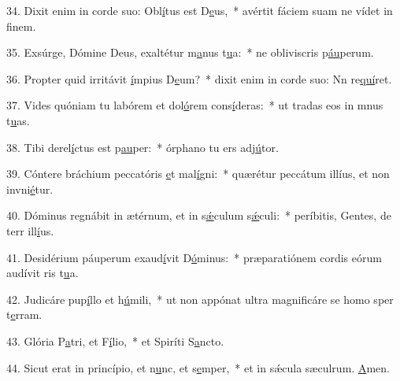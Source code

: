 34. Dixit enim in corde suo: Obl\uline{í}tus est D\uline{e}us,~* avértit fáciem suam ne vídet in f\uline{i}nem.\par 
35. Exsúrge, Dómine Deus, exaltétur m\uline{a}nus t\uline{u}a:~* ne obliviscris p\uline{áu}perum.\par 
36. Propter quid irritávit \uline{í}mpius D\uline{e}um?~* dixit enim in corde suo: Nn re\uline{quí}ret.\par 
37. Vides quóniam tu labórem et dol\uline{ó}rem cons\uline{í}deras:~* ut tradas eos in mnus t\uline{u}as.\par 
38. Tibi derel\uline{í}ctus est p\uline{au}per:~* órphano tu ers adj\uline{ú}tor.\par 
39. Cóntere bráchium peccatóris \uline{e}t mal\uline{í}gni:~* quærétur peccátum illíus, et non invni\uline{é}tur.\par 
40. Dóminus regnábit in ætérnum, et in s\uline{ǽ}culum s\uline{ǽ}culi:~* períbitis, Gentes, de terr ill\uline{í}us.\par 
41. Desidérium páuperum exaud\uline{í}vit D\uline{ó}minus:~* præparatiónem cordis eórum audívit ris t\uline{u}a.\par 
42. Judicáre pup\uline{í}llo et h\uline{ú}mili,~* ut non appónat ultra magnificáre se homo sper t\uline{e}rram.\par 
43. Glória P\uline{a}tri, et F\uline{í}lio,~* et Spiríti S\uline{a}ncto.\par 
44. Sicut erat in princípio, et n\uline{u}nc, et s\uline{e}mper,~* et in sǽcula sæculrum. \uline{A}men.\par 
